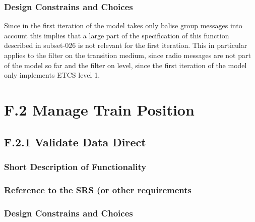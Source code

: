 \documentclass{template/openetcs_report}
\begin{document}
\subsubsection{Design Constrains and Choices}
 Since in the first iteration of the model takes only balise group messages into account this implies that a large part of the specification of this function described in subset-026 is not relevant for the first iteration. This in particular applies to the filter on the transition medium, since radio messages are not part of the model so far and the filter on level, since the first iteration of the model only implements ETCS level 1.

\section{F.2 Manage Train Position}


\subsection{F.2.1 Validate Data Direct}

\subsubsection{Short Description of Functionality}
\subsubsection{Reference to the SRS (or other requirements}
\subsubsection{Design Constrains and Choices}





%
%
%
%



\end{document}
